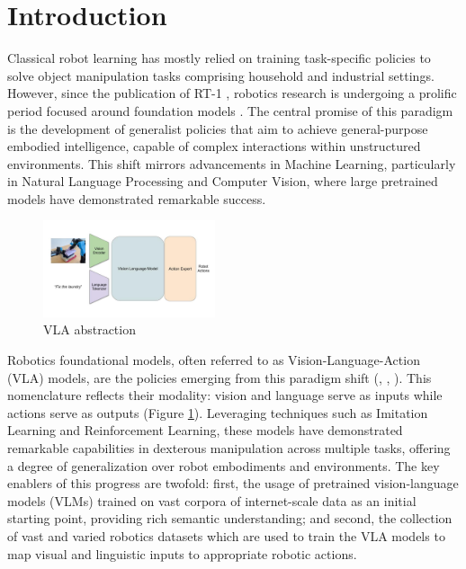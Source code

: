 \section{Introduction}

Classical robot learning has mostly relied on training task-specific policies to solve object manipulation tasks comprising household and industrial settings. However, since the publication of RT-1 \cite{RT-1}, robotics research is undergoing a prolific period focused around foundation models \cite{FoundationalModels}. The central promise of this paradigm is the development of generalist policies that aim to achieve general-purpose embodied intelligence, capable of complex interactions within unstructured environments. This shift mirrors advancements in Machine Learning, particularly in Natural Language Processing and Computer Vision, where large pretrained models have demonstrated remarkable success.

\begin{figure}
    \vspace{-15pt}
    \centering
    \includegraphics[width=0.45\textwidth]{images/vla.jpg}
    \caption{VLA abstraction}
    \label{fig:vla_abstraction}
    \vspace{-15pt}
\end{figure}

Robotics foundational models, often referred to as Vision-Language-Action (VLA) models, are the policies 
emerging from this paradigm shift (\cite{OpenVLA}, \cite{Gr00tN1}, \cite{pi_zero}). This nomenclature reflects their modality: vision and language serve as inputs while 
actions serve as outputs (Figure \ref{fig:vla_abstraction}). Leveraging techniques such as Imitation Learning and 
Reinforcement Learning, these models have demonstrated remarkable capabilities in dexterous manipulation across multiple tasks, 
offering a degree of generalization over robot embodiments and environments. The key enablers of this progress are twofold: 
first, the usage of pretrained vision-language models (VLMs) trained on vast corpora of internet-scale data as an initial 
starting point, providing rich semantic understanding; and second, the collection of vast and varied robotics datasets 
which are used to train the VLA models to map visual and linguistic inputs to appropriate robotic actions.

